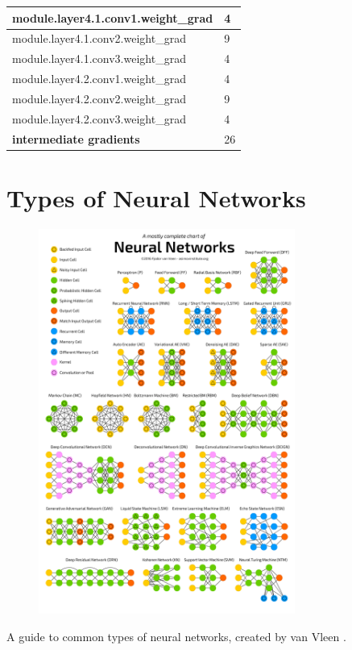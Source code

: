 \documentclass[12pt,letterpaper]{article}
\begin{document}
\begin{appendices}
\begin{longtable}{@{}ll@{}}
module.layer4.1.conv1.weight\_grad        & 4    \\ \midrule
module.layer4.1.conv2.weight\_grad        & 9    \\ \midrule
module.layer4.1.conv3.weight\_grad        & 4    \\ \midrule
module.layer4.2.conv1.weight\_grad        & 4    \\ \midrule
module.layer4.2.conv2.weight\_grad        & 9    \\ \midrule
module.layer4.2.conv3.weight\_grad        & 4    \\ \midrule
\textbf{intermediate gradients}                       & 26   \\ \bottomrule
\end{longtable}
\newpage


\section{Types of Neural Networks}
\label{appendix:types_of_networks}
\begin{figure}[ht]
\centering
\includegraphics[width=0.75\textwidth]{types_of_NN.png}
\end{figure}
\begin{center}A guide to common types of neural networks, created by van Vleen \cite{types_of_NN_pic}.\end{center}
\newpage


\end{appendices}
\end{document}
